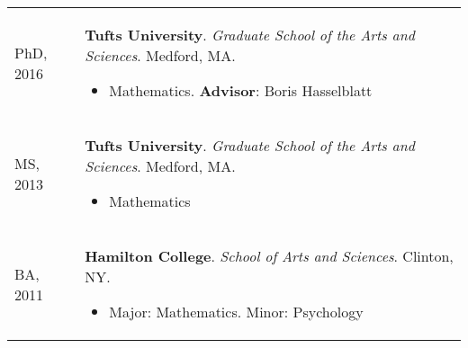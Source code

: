 
    \medskip


    \medskip
    
    \begin{center}
    {
    \renewcommand{\arraystretch}{1.5}
    \begin{longtable}{p{}  p{}}
    PhD, 2016 & \textbf{Tufts University}. \textit{Graduate School of the Arts and Sciences}.  Medford, MA. 
        \hspace{-1em}

        {\small
        \begin{itemize}
        \setlength{\parindent}{0em}
        \item[] Mathematics. \textbf{ Advisor}: Boris Hasselblatt
        \end{itemize}
        }
        \vspace{-1em}
         \\ 
MS, 2013 & \textbf{Tufts University}. \textit{Graduate School of the Arts and Sciences}.  Medford, MA. 
        \hspace{-1em}

        {\small
        \begin{itemize}
        \setlength{\parindent}{0em}
        \item[] Mathematics
        \end{itemize}
        }
        \vspace{-1em}
         \\ 
BA, 2011 & \textbf{Hamilton College}. \textit{School of Arts and Sciences}.  Clinton, NY. 
        \hspace{-1em}

        {\small
        \begin{itemize}
        \setlength{\parindent}{0em}
        \item[] Major: Mathematics. Minor: Psychology
        \end{itemize}
        }
        \vspace{-1em}
         
    \end{longtable}
    } 
    \end{center}

    \vspace{-1em}
    